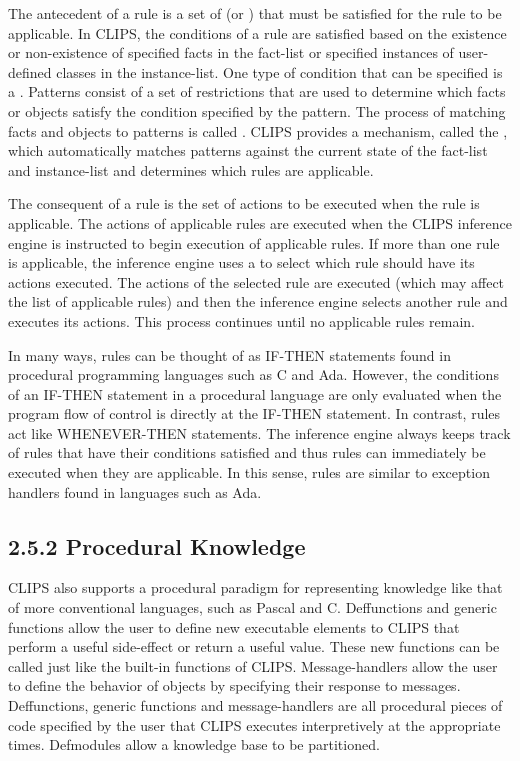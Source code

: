 \documentclass[letterpaper,10pt,english]{sphinxmanual}
\begin{document}
The antecedent of a rule is a set of  (or ) that must be satisfied for the rule to be applicable. In
CLIPS, the conditions of a rule are satisfied based on the existence or
non-existence of specified facts in the fact-list or specified instances
of user-defined classes in the instance-list. One type of condition that
can be specified is a . Patterns consist of a set of
restrictions that are used to determine which facts or objects satisfy
the condition specified by the pattern. The process of matching facts
and objects to patterns is called . CLIPS provides a
mechanism, called the , which automatically matches
patterns against the current state of the fact-list and instance-list
and determines which rules are applicable.

The consequent of a rule is the set of actions to be executed when the
rule is applicable. The actions of applicable rules are executed when
the CLIPS inference engine is instructed to begin execution of
applicable rules. If more than one rule is applicable, the inference
engine uses a  to select which rule
should have its actions executed. The actions of the selected rule are
executed (which may affect the list of applicable rules) and then the
inference engine selects another rule and executes its actions. This
process continues until no applicable rules remain.

In many ways, rules can be thought of as IF-THEN statements found in
procedural programming languages such as C and Ada. However, the
conditions of an IF-THEN statement in a procedural language are only
evaluated when the program flow of control is directly at the IF-THEN
statement. In contrast, rules act like WHENEVER-THEN statements. The
inference engine always keeps track of rules that have their conditions
satisfied and thus rules can immediately be executed when they are
applicable. In this sense, rules are similar to exception handlers found
in languages such as Ada.


\subsection{2.5.2 Procedural Knowledge}
\label{\detokenize{overview:procedural-knowledge}}
CLIPS also supports a procedural paradigm for representing knowledge
like that of more conventional languages, such as Pascal and C.
Deffunctions and generic functions allow the user to define new
executable elements to CLIPS that perform a useful side-effect or return
a useful value. These new functions can be called just like the built-in
functions of CLIPS. Message-handlers allow the user to define the
behavior of objects by specifying their response to messages.
Deffunctions, generic functions and message-handlers are all procedural
pieces of code specified by the user that CLIPS executes interpretively
at the appropriate times. Defmodules allow a knowledge base to be
partitioned.
\end{document}
